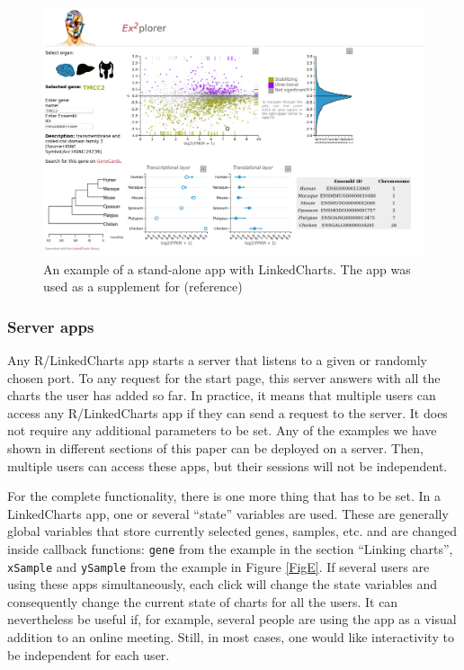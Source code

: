 \documentclass[twocolumn,10pt]{article}
\begin{document}
\begin{figure}[t]
   \includegraphics[width=\textwidth]{FigF/figF.png}
   \caption{An example of a stand-alone app with LinkedCharts. The app was used as a supplement for (reference)}
   \label{FigF}
\end{figure}

\subsubsection{Server apps}

Any R/LinkedCharts app starts a server that listens to a given or randomly chosen port. To any request for the start page, this server answers with all the charts the user has added so far. In practice, it means that multiple users can access any R/LinkedCharts app if they can send a request to the server. It does not require any additional parameters to be set. Any of the examples we have shown in different sections of this paper can be deployed on a server. Then, multiple users can access these apps, but their sessions will not be independent.

For the complete functionality, there is one more thing that has to be set. In a LinkedCharts app, one or several ``state'' variables are used. These are generally global variables that store currently selected genes, samples, etc. and are changed inside callback functions: \texttt{gene} from the example in the section ``Linking charts'', \texttt{xSample} and \texttt{ySample} from the example in Figure \ref{FigE}. If several users are using these apps simultaneously, each click will change the state variables and consequently change the current state of charts for all the users. It can nevertheless be useful if, for example, several people are using the app as a visual addition to an online meeting. Still, in most cases, one would like interactivity to be independent for each user.
\end{document}
